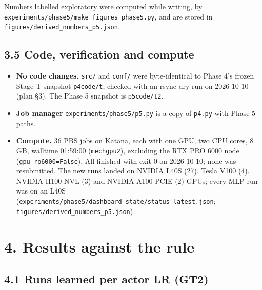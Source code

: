 \documentclass[11pt]{article}
\begin{document}
Numbers labelled exploratory were computed while writing, by \texttt{experiments/\allowbreak{}phase5/\allowbreak{}make\_\allowbreak{}figures\_\allowbreak{}phase5.\allowbreak{}py}, and are stored in \texttt{figures/\allowbreak{}derived\_\allowbreak{}numbers\_\allowbreak{}p5.\allowbreak{}json}.



\subsection*{3.5 Code, verification and compute}



\begin{itemize}
\item \textbf{No code changes.} \texttt{src/} and \texttt{conf/} were byte-identical to Phase 4's frozen Stage T snapshot \texttt{p4code/t}, checked with an rsync dry run on 2026-10-10 (plan \S{}3). The Phase 5 snapshot is \texttt{p5code/t2}.
\item \textbf{Job manager} \texttt{experiments/\allowbreak{}phase5/\allowbreak{}p5.\allowbreak{}py} is a copy of \texttt{p4.py} with Phase 5 paths.
\item \textbf{Compute.} 36 PBS jobs on Katana, each with one GPU, two CPU cores, 8 GB, walltime 01:59:00 (\texttt{mechgpu2}), excluding the RTX PRO 6000 node (\texttt{gpu\_\allowbreak{}rp6000=False}). All finished with exit 0 on 2026-10-10; none was resubmitted. The new runs landed on NVIDIA L40S (27), Tesla V100 (4), NVIDIA H100 NVL (3) and NVIDIA A100-PCIE (2) GPUs; every MLP run was on an L40S (\texttt{experiments/\allowbreak{}phase5/\allowbreak{}dashboard\_\allowbreak{}state/\allowbreak{}status\_\allowbreak{}latest.\allowbreak{}json}; \texttt{figures/\allowbreak{}derived\_\allowbreak{}numbers\_\allowbreak{}p5.\allowbreak{}json}).
\end{itemize}



\section*{4. Results against the rule}



\subsection*{4.1 Runs learned per actor LR (GT2)}
\end{document}
